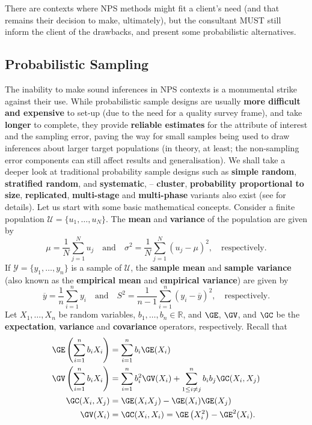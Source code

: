 There are contexts where NPS methods might fit a client's need (and that remains their decision to make, ultimately), but the consultant MUST still inform the client of the drawbacks, and present some  probabilistic alternatives.  
\subsection{Probabilistic Sampling}
The inability to make sound inferences in NPS contexts is a monumental strike against their use. While probabilistic sample designs are usually \textbf{more difficult and expensive} to set-up (due to the need for a quality survey frame), and take \textbf{longer} to complete, they provide \textbf{reliable estimates} for the attribute of interest and the sampling error, paving the way for  small samples being used to draw inferences about  larger target populations (in theory, at least; the non-sampling error components can still affect results and generalisation). \newl We shall take a deeper look at traditional probability sample designs such as \textbf{simple random}, \textbf{stratified random}, and \textbf{systematic},   -- \textbf{cluster}, \textbf{probability proportional to size}, \textbf{replicated}, \textbf{multi-stage} and \textbf{multi-phase} variants also exist (see \cite{DC_F,DC_SC} for details).\newl
Let us start with some basic mathematical concepts. Consider a finite population $\mathcal{U}=\{u_1,\ldots,u_N\}$. The \textbf{mean} and \textbf{variance} of the population are given by 
$$\mu=\frac{1}{N}\sum_{j=1}^Nu_j\quad\mbox{and}\quad \sigma^2=\frac{1}{N}\sum_{j=1}^N(u_j-\mu)^2, \quad\mbox{respectively.}$$ If $\mathcal{Y}=\{y_1,\ldots,y_n\}$ is a sample of $\mathcal{U}$, the \textbf{sample mean} and \textbf{sample variance} (also known as the \textbf{empirical mean} and \textbf{empirical variance}) are given by 
$$\overline{y}=\frac{1}{n}\sum_{i=1}^ny_i\quad\mbox{and}\quad S^2=\frac{1}{n-1}\sum_{i=1}^n(y_i-\overline{y})^2, \quad\mbox{respectively.}$$ Let $X_1,\ldots,X_n$ be random variables, $b_1,\ldots,b_n\in \mathbb{R}$, and $\GE$, $\GV$, and $\GC$ be the \textbf{expectation}, \textbf{variance} and \textbf{covariance} operators, respectively. Recall that 
\begin{align*}
    \GE \left(\sum_{i=1}^nb_iX_i\right) &=\sum_{i=1}^nb_i\GE(X_i) \\
    \GV\left(\sum_{i=1}^nb_iX_i\right)&=\sum_{i=1}^n b_i^2\GV(X_i)+\sum_{1\leq i\neq j}^nb_ib_j\GC(X_i,X_j) \\
\GC(X_i,X_j)&=\GE(X_iX_j)-\GE(X_i)\GE(X_j)\\
\GV(X_i)&=\GC(X_i,X_i)=\GE\left(X_i^2\right)-\GE^2(X_i).
\end{align*}

